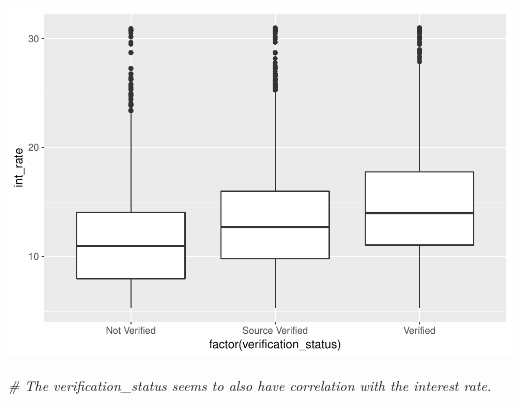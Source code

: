 \documentclass[]{article}
\newenvironment{Shaded}{\begin{snugshade}}{\end{snugshade}}
\newcommand{\CommentTok}[1]{\textcolor[rgb]{0.56,0.35,0.01}{\textit{#1}}}
\begin{document}
\includegraphics{Machine_learning_Group_7_files/figure-latex/Data Exploration - interest rate vs verification_status-1.pdf}

\begin{Shaded}
\begin{Highlighting}[]
\CommentTok{# The verification_status seems to also have correlation with the interest rate.}
\end{Highlighting}
\end{Shaded}
\end{document}
